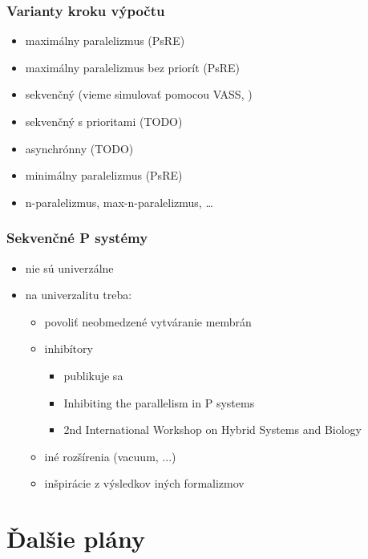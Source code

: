 \documentclass{beamer}
\begin{document}
\begin{frame}[t]\frametitle{Varianty kroku výpočtu}
\begin{itemize}
  \item maximálny paralelizmus (PsRE)
  \item maximálny paralelizmus bez priorít (PsRE) \cite{Sosik:2002:WithoutPriorities}
  \item sekvenčný (vieme simulovať pomocou VASS, \cite{Dang:2005:Sequential})
  \item sekvenčný s prioritami (TODO)
  \item asynchrónny (TODO)
  \item minimálny paralelizmus (PsRE) \cite{Ciobanu:2007:MinimalParallelism}
  \item n-paralelizmus, max-n-paralelizmus, \dots
\end{itemize}
\end{frame}

\begin{frame}[t]\frametitle{Sekvenčné P systémy}
\begin{itemize}
  \item nie sú univerzálne
  \item na univerzalitu treba:
  \begin{itemize}
    \item povoliť neobmedzené vytváranie membrán \cite{Dang:2005:Sequential}
    \item inhibítory
      \begin{itemize}
        \item publikuje sa
        \item Inhibiting the parallelism in P systems
        \item 2nd International Workshop on Hybrid Systems and Biology
      \end{itemize}
    \item iné rozšírenia (vacuum, ...)
    \item inšpirácie z výsledkov iných formalizmov
  \end{itemize}
\end{itemize}
\end{frame}


\section{Ďalšie plány} %
\label{sec:dalsie_plany}
\end{document}
